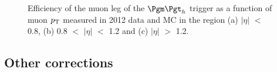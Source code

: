 \begin{figure}[htb]

\begin{center}
\end{center}
\caption[Efficiency of the muon leg of the $\mutau$ trigger as a function of muon $\pt$ measured in
2012 data and MC.]{Efficiency of the muon leg of the $\mutau$ trigger as a function of muon $\pt$ measured in
2012 data and \ac{MC} in the region (a) $|\eta|$ $<$ 0.8, (b) 0.8
$<$ $|\eta|$ $<$ 1.2 and (c) $|\eta|$ $>$ 1.2.}
\label{fig:muontrg}
\end{figure}

\subsection{Other corrections}
\label{sec:othercorrections}

